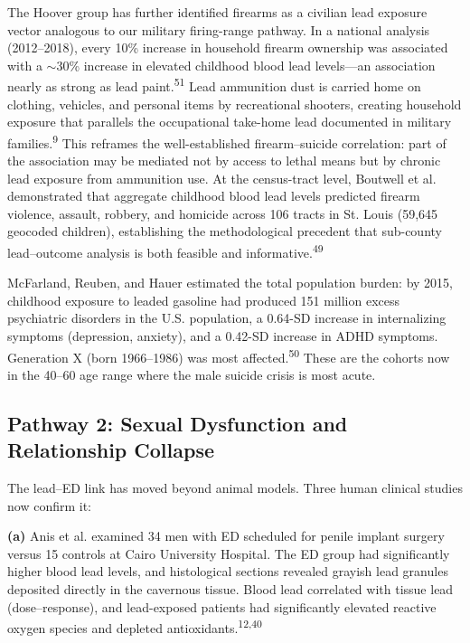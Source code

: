 \documentclass[11pt,twocolumn]{article}
\begin{document}
The Hoover group has further identified firearms as a civilian lead exposure vector analogous to our military firing-range pathway. In a national analysis (2012--2018), every 10\% increase in household firearm ownership was associated with a $\sim$30\% increase in elevated childhood blood lead levels---an association nearly as strong as lead paint.\textsuperscript{51} Lead ammunition dust is carried home on clothing, vehicles, and personal items by recreational shooters, creating household exposure that parallels the occupational take-home lead documented in military families.\textsuperscript{9} This reframes the well-established firearm--suicide correlation: part of the association may be mediated not by access to lethal means but by chronic lead exposure from ammunition use. At the census-tract level, Boutwell et al. demonstrated that aggregate childhood blood lead levels predicted firearm violence, assault, robbery, and homicide across 106 tracts in St. Louis (59,645 geocoded children), establishing the methodological precedent that sub-county lead--outcome analysis is both feasible and informative.\textsuperscript{49}

McFarland, Reuben, and Hauer estimated the total population burden: by 2015, childhood exposure to leaded gasoline had produced 151 million excess psychiatric disorders in the U.S. population, a 0.64-SD increase in internalizing symptoms (depression, anxiety), and a 0.42-SD increase in ADHD symptoms. Generation X (born 1966--1986) was most affected.\textsuperscript{50} These are the cohorts now in the 40--60 age range where the male suicide crisis is most acute.

\subsection{Pathway 2: Sexual Dysfunction and Relationship Collapse}

The lead--ED link has moved beyond animal models. Three human clinical studies now confirm it:

\textbf{(a)} Anis et al. examined 34 men with ED scheduled for penile implant surgery versus 15 controls at Cairo University Hospital. The ED group had significantly higher blood lead levels, and histological sections revealed grayish lead granules deposited directly in the cavernous tissue. Blood lead correlated with tissue lead (dose--response), and lead-exposed patients had significantly elevated reactive oxygen species and depleted antioxidants.\textsuperscript{12,40}
\end{document}
